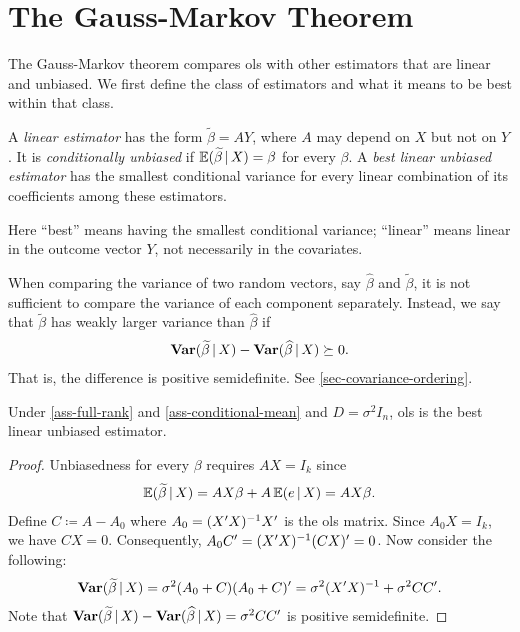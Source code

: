 \documentclass[a4paper,12pt]{article}
\begin{document}
\section{The Gauss-Markov Theorem}

The Gauss-Markov theorem compares \gls{ols} with other estimators that are linear and unbiased.
We first define the class of estimators and what it means to be best within that class.

\begin{definition}
	A \emph{linear estimator} has the form $\widetilde\beta=AY$, where $A$ may depend on $X$ but not on $Y$.
	It is \emph{conditionally unbiased} if $\operatorname{\mathbb{E}}(\widetilde\beta\mathpunct{}|\mathpunct{} X)=\beta$ for every $\beta$.
	A \emph{best linear unbiased estimator} has the smallest conditional variance for every linear combination of its coefficients among these estimators.
\end{definition}

\begin{remark}
	Here
	``best'' means having the smallest conditional variance;
	``linear'' means linear in the outcome vector $Y$, not necessarily in the covariates.
\end{remark}

\begin{remark}
	When comparing the variance of two random vectors,
	say $\widehat\beta$ and $\widetilde\beta$,
	it is not sufficient to compare the variance of each component separately.
	Instead, we say that $\widetilde\beta$ has weakly larger variance than $\widehat\beta$ if
	\begin{align}
		\operatorname{\text{\textrm{\upshape\textbf{Var}}}}(\widetilde\beta\mathpunct{}|\mathpunct{} X) - \operatorname{\text{\textrm{\upshape\textbf{Var}}}}(\widehat\beta\mathpunct{}|\mathpunct{} X)
		\succeq 0.
	\end{align}
	That is, the difference is positive semidefinite.
	See \autoref{sec-covariance-ordering}.
\end{remark}

\begin{theorem}\label{thm-gauss-markov}
	Under \autoref{ass-full-rank} and \ref{ass-conditional-mean} and $D=\sigma^2 I_n$,
	\gls{ols} is the best linear unbiased estimator.
\end{theorem}
\begin{proof}
	Unbiasedness for every $\beta$ requires $AX=I_k$ since
	\begin{align*}
		\operatorname{\mathbb{E}}(\widetilde\beta\mathpunct{}|\mathpunct{} X)=AX\beta+A\operatorname{\mathbb{E}}(e\mathpunct{}|\mathpunct{} X)=AX\beta.
	\end{align*}
	Define $C\coloneqq A-A_0$ where $A_0=(X^{\prime} X)^{-1} X^{\prime}$ is the \gls{ols} matrix.
	Since $A_0X=I_k$, we have $CX=0$.
	Consequently, $A_0C^{\prime}=(X^{\prime} X)^{-1}(CX)^{\prime}=0$.
	Now consider the following:
	\begin{align*}
		\operatorname{\text{\textrm{\upshape\textbf{Var}}}}(\widetilde\beta\mathpunct{}|\mathpunct{} X)
		=\sigma^2(A_0+C)(A_0+C)^{\prime}
		=\sigma^2(X^{\prime} X)^{-1}+\sigma^2CC^{\prime}.
	\end{align*}
	Note that $\operatorname{\text{\textrm{\upshape\textbf{Var}}}}(\widetilde\beta\mathpunct{}|\mathpunct{} X)-\operatorname{\text{\textrm{\upshape\textbf{Var}}}}(\widehat\beta\mathpunct{}|\mathpunct{} X)=\sigma^2 CC'$
	is positive semidefinite.
\end{proof}
\end{document}
